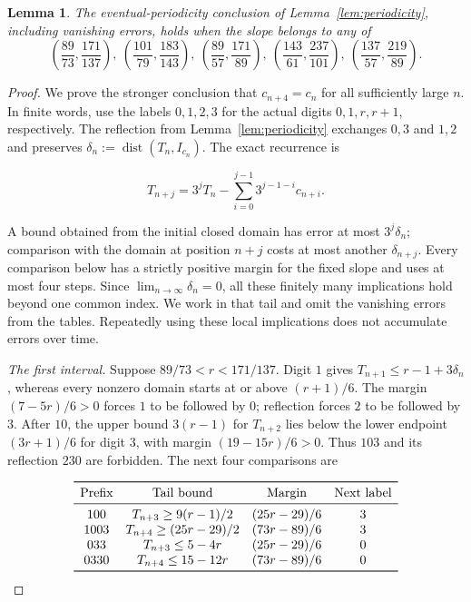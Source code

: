 \documentclass[11pt,a4paper]{amsart}
\numberwithin{equation}{section}
\newtheorem{lemma}[theorem]{Lemma}
\theoremstyle{definition}
\begin{document}
\begin{lemma}\label{lem:good-slopes}
The eventual-periodicity conclusion of Lemma~\ref{lem:periodicity},
including vanishing errors, holds when the slope belongs to any of
\[
\left(\frac{89}{73},\frac{171}{137}\right),\
\left(\frac{101}{79},\frac{183}{143}\right),\
\left(\frac{89}{57},\frac{171}{89}\right),\
\left(\frac{143}{61},\frac{237}{101}\right),\
\left(\frac{137}{57},\frac{219}{89}\right).
\]
\end{lemma}
\begin{proof}
We prove the stronger conclusion that \(c_{n+4}=c_n\) for all sufficiently
large \(n\). In finite words, use the labels \(0,1,2,3\) for the actual
digits \(0,1,r,r+1\), respectively. The reflection from
Lemma~\ref{lem:periodicity} exchanges \(0,3\) and \(1,2\) and preserves
\(\delta_n:=\operatorname{dist}(T_n,I_{c_n})\).
The exact recurrence is

\[
T_{n+j}=3^jT_n-\sum_{i=0}^{j-1}3^{j-1-i}c_{n+i}.
\]

A bound obtained from the initial closed domain has error at most
\(3^j\delta_n\); comparison with the domain at position \(n+j\) costs
at most another \(\delta_{n+j}\). Every comparison below has a strictly
positive margin for the fixed slope and uses at most four steps.
Since \(\displaystyle\lim_{n\to\infty}\delta_n=0\), all these finitely
many implications hold beyond one common index. We work in that tail
and omit the vanishing errors from the tables. Repeatedly using these
local implications does not accumulate errors over time.

\emph{The first interval.}
Suppose \(89/73<r<171/137\). Digit \(1\) gives
\(T_{n+1}\le r-1+3\delta_n\), whereas every nonzero domain starts
at or above \((r+1)/6\). The margin \((7-5r)/6>0\) forces \(1\)
to be followed by \(0\); reflection forces \(2\) to be followed by
\(3\). After \(10\), the upper bound \(3(r-1)\) for \(T_{n+2}\)
lies below the lower endpoint \((3r+1)/6\) for digit \(3\), with
margin \((19-15r)/6>0\). Thus \(103\) and its reflection \(230\)
are forbidden. The next four comparisons are

\[
\begin{array}{c@{\quad}c@{\quad}c@{\quad}c}
\toprule
\text{Prefix} & \text{Tail bound} & \text{Margin} & \text{Next label}\\
\midrule
100 & T_{n+3}\ge9(r-1)/2 & (25r-29)/6 & 3\\
1003 & T_{n+4}\ge(25r-29)/2 & (73r-89)/6 & 3\\
033 & T_{n+3}\le5-4r & (25r-29)/6 & 0\\
0330 & T_{n+4}\le15-12r & (73r-89)/6 & 0\\
\bottomrule
\end{array}
\]


\end{proof}
\end{document}
